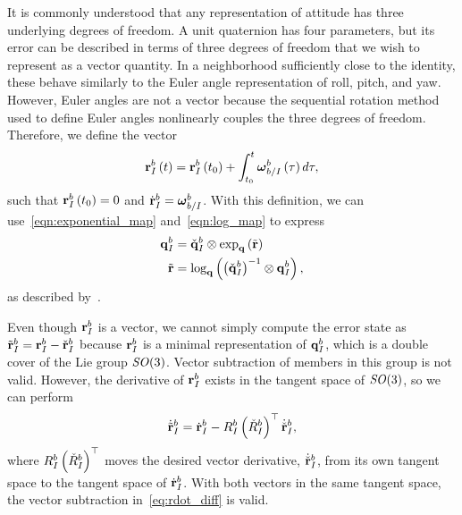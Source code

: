 It is commonly understood that any representation of attitude has three
underlying degrees of freedom.  A unit quaternion has four parameters, but its
error can be described in terms of three degrees of freedom that we wish
to represent as a vector quantity.   In a neighborhood sufficiently close to the
identity,
these behave similarly to the Euler angle representation of roll, pitch,
and yaw. However, Euler angles are not a vector because the sequential rotation
method used to define Euler angles nonlinearly couples the three degrees of
freedom. Therefore, we define the vector
\begin{equation}
  \label{eq:r_def}
  \boldsymbol{\mathrm{r}}_I^b\left(t\right)=\boldsymbol{\mathrm{r}}_I^b\left(t_0\right)+\int_{t_{0}}^{t}\boldsymbol{\mathrm{\omega}}_{b/I}^{b}\left(\tau\right)d\tau,
\end{equation}
such that $\boldsymbol{\mathrm{r}}_I^b\left(t_0\right) = 0$ and $\dot{\boldsymbol{\mathrm{r}}}_I^b = \boldsymbol{\mathrm{\omega}}_{b/I}^{b}$.
With this definition, we can use~\eqref{eqn:exponential_map}
and~\eqref{eqn:log_map} to express
\begin{align}
  \label{eq:q_des}
  \boldsymbol{\mathrm{q}}_{I}^{b} &= \check{\boldsymbol{\mathrm{q}}}_{I}^{b} \otimes \exp_{\boldsymbol{\mathrm{q}}} \left(\tilde{\boldsymbol{\mathrm{r}}}\right) \\
  \tilde{\boldsymbol{\mathrm{r}}} &= \log_{\boldsymbol{\mathrm{q}}} \left(\left(\check{\boldsymbol{\mathrm{q}}}_{I}^{b}\right)^{-1} \otimes
    \boldsymbol{\mathrm{q}}_{I}^{b}\right),
\end{align}
as described by~\cite{hertzberg2013integrating}.

Even though $\boldsymbol{\mathrm{r}}_I^b$ is a vector, we cannot simply compute the error state
as $\tilde{\boldsymbol{\mathrm{r}}}_I^b=\boldsymbol{\mathrm{r}}_I^b-\check{\boldsymbol{\mathrm{r}}}_I^b$ because $\boldsymbol{\mathrm{r}}_I^b$
is a minimal representation of $\boldsymbol{\mathrm{q}}_I^b$, which is a double cover of the
Lie group $\SO\mathopen{}\mathclose\bgroup\left(3\aftergroup\egroup\right)$. %
Vector subtraction of members in this group is not valid.
However, the derivative of $\boldsymbol{\mathrm{r}}_I^b$ exists in the tangent space of $\SO\mathopen{}\mathclose\bgroup\left(3\aftergroup\egroup\right)$, so we can perform
\begin{equation}
\label{eq:rdot_diff}
\dot{\tilde{\boldsymbol{\mathrm{r}}}}_I^b=\dot{\boldsymbol{\mathrm{r}}}_I^b-R_I^b\left(\check{R}_I^b\right)^{\top}\dot{\check{\boldsymbol{\mathrm{r}}}}_I^b,
\end{equation}
where $R_I^b\left(\check{R}_I^b\right)^{\top}$ moves the desired vector
derivative, $\dot{\check{\boldsymbol{\mathrm{r}}}}_I^b$, from its own tangent space to the tangent space of $\dot{\boldsymbol{\mathrm{r}}}_I^b$.
With both vectors in the same tangent space, the vector subtraction in~\eqref{eq:rdot_diff} is valid.

